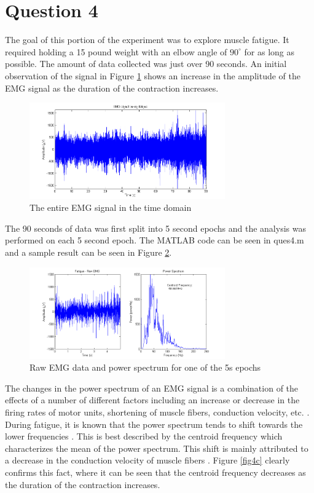 \documentclass[11pt]{article}
\numberwithin{equation}{section}	%
\begin{document}

\section*{Question 4}
The goal of this portion of the experiment was to explore muscle fatigue. It required holding a 15 pound weight with an elbow angle of \(90^\circ\) for as long as possible. The amount of data collected was just over 90 seconds. An initial observation of the signal in Figure \ref{fig4a} shows an increase in the amplitude of the EMG signal as the duration of the contraction increases. 

\begin{figure}[!ht]
  \centering
    \includegraphics[width=0.75\textwidth]{fig4a}
	\caption{The entire EMG signal in the time domain}
	\label{fig4a}
\end{figure}

The 90 seconds of data was first split into 5 second epochs and the analysis was performed on each 5 second epoch. The MATLAB code can be seen in ques4.m and a sample result can be seen in Figure \ref{fig4b}.

\begin{figure}[!ht]
  \centering
    \includegraphics[width=0.75\textwidth]{fig4b}
	\caption{Raw EMG data and power spectrum for one of the 5s epochs}
	\label{fig4b}
\end{figure}

The changes in the power spectrum of an EMG signal is a combination of the effects of a number of different factors including an increase or decrease in the firing rates of motor units, shortening of muscle fibers, conduction velocity, etc. \cite{Arendt-Nielsen1989}. During fatigue, it is known that the power spectrum tends to shift towards the lower frequencies \cite{Arendt-Nielsen1989,Hagg1992,Bigard2001,Sbriccoli2003}. This is best described by the centroid frequency which characterizes the mean of the power spectrum. This shift is mainly attributed to a decrease in the conduction velocity of muscle fibers \cite{Arendt-Nielsen1989}. Figure \ref{fig4c} clearly confirms this fact, where it can be seen that the centroid frequency decreases as the duration of the contraction increases.
\end{document}
